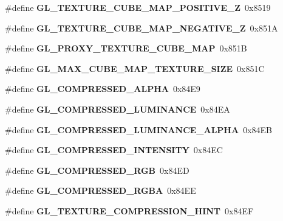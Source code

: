 \begin{DoxyCompactItemize}
\item 
\#define {\bfseries G\+L\+\_\+\+T\+E\+X\+T\+U\+R\+E\+\_\+\+C\+U\+B\+E\+\_\+\+M\+A\+P\+\_\+\+P\+O\+S\+I\+T\+I\+V\+E\+\_\+\+Z}~0x8519\label{_s_d_l__opengl_8h_a9c63e51b23baa3e2abc01cc0c892a111}

\item 
\#define {\bfseries G\+L\+\_\+\+T\+E\+X\+T\+U\+R\+E\+\_\+\+C\+U\+B\+E\+\_\+\+M\+A\+P\+\_\+\+N\+E\+G\+A\+T\+I\+V\+E\+\_\+\+Z}~0x851\+A\label{_s_d_l__opengl_8h_a2d568ba9541df33fb21dc5bacbe7b4a3}

\item 
\#define {\bfseries G\+L\+\_\+\+P\+R\+O\+X\+Y\+\_\+\+T\+E\+X\+T\+U\+R\+E\+\_\+\+C\+U\+B\+E\+\_\+\+M\+A\+P}~0x851\+B\label{_s_d_l__opengl_8h_a2235d0c1385ca8f93745311a04e05527}

\item 
\#define {\bfseries G\+L\+\_\+\+M\+A\+X\+\_\+\+C\+U\+B\+E\+\_\+\+M\+A\+P\+\_\+\+T\+E\+X\+T\+U\+R\+E\+\_\+\+S\+I\+Z\+E}~0x851\+C\label{_s_d_l__opengl_8h_a632039148b57b1df2b23f1ef1c94de34}

\item 
\#define {\bfseries G\+L\+\_\+\+C\+O\+M\+P\+R\+E\+S\+S\+E\+D\+\_\+\+A\+L\+P\+H\+A}~0x84\+E9\label{_s_d_l__opengl_8h_a1d4cae88f55b01dc32912907caf0e388}

\item 
\#define {\bfseries G\+L\+\_\+\+C\+O\+M\+P\+R\+E\+S\+S\+E\+D\+\_\+\+L\+U\+M\+I\+N\+A\+N\+C\+E}~0x84\+E\+A\label{_s_d_l__opengl_8h_a48550b692c808f2770a7c4953d574c6b}

\item 
\#define {\bfseries G\+L\+\_\+\+C\+O\+M\+P\+R\+E\+S\+S\+E\+D\+\_\+\+L\+U\+M\+I\+N\+A\+N\+C\+E\+\_\+\+A\+L\+P\+H\+A}~0x84\+E\+B\label{_s_d_l__opengl_8h_a7b67d430c0f3c1a6b370946a4993dc91}

\item 
\#define {\bfseries G\+L\+\_\+\+C\+O\+M\+P\+R\+E\+S\+S\+E\+D\+\_\+\+I\+N\+T\+E\+N\+S\+I\+T\+Y}~0x84\+E\+C\label{_s_d_l__opengl_8h_a9bb9ee74b17675d2eb85780c9eb30e76}

\item 
\#define {\bfseries G\+L\+\_\+\+C\+O\+M\+P\+R\+E\+S\+S\+E\+D\+\_\+\+R\+G\+B}~0x84\+E\+D\label{_s_d_l__opengl_8h_a6d53cfb9b7cbe9abb9253afcea445b04}

\item 
\#define {\bfseries G\+L\+\_\+\+C\+O\+M\+P\+R\+E\+S\+S\+E\+D\+\_\+\+R\+G\+B\+A}~0x84\+E\+E\label{_s_d_l__opengl_8h_a61f07c72b49869caa447fed2d8ab892b}

\item 
\#define {\bfseries G\+L\+\_\+\+T\+E\+X\+T\+U\+R\+E\+\_\+\+C\+O\+M\+P\+R\+E\+S\+S\+I\+O\+N\+\_\+\+H\+I\+N\+T}~0x84\+E\+F\label{_s_d_l__opengl_8h_a7970d7bc60644feb1efd44ac9ce1e796}


\end{DoxyCompactItemize}
